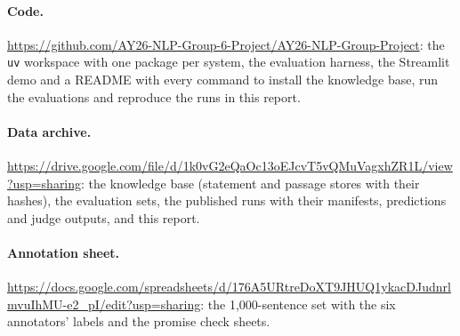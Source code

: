 \documentclass[11pt]{article}
\newcommand{\datalink}{\url{https://drive.google.com/file/d/1k0vG2eQaOc13oEJcvT5vQMuVagxhZR1L/view?usp=sharing}}
\newcommand{\codelink}{\url{https://github.com/AY26-NLP-Group-6-Project/AY26-NLP-Group-Project}}
\newcommand{\sheetlink}{\url{https://docs.google.com/spreadsheets/d/176A5URtreDoXT9JHUQ1ykacDJudnrlmvuIhMU-e2_pI/edit?usp=sharing}}
\begin{document}
\paragraph{Code.} \codelink{}: the \texttt{uv} workspace with one package per system, the evaluation harness, the Streamlit demo and a README with every command to install the knowledge base, run the evaluations and reproduce the runs in this report.
\paragraph{Data archive.} \datalink{}: the knowledge base (statement and passage stores with their hashes), the evaluation sets, the published runs with their manifests, predictions and judge outputs, and this report.
\paragraph{Annotation sheet.} \sheetlink{}: the 1,000-sentence set with the six annotators' labels and the promise check sheets.
\end{document}
